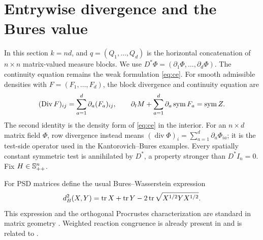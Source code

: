 \section{Entrywise divergence and the Bures value}\label{sec:bures}
In this section $k=nd$, and $q=(Q_1,\ldots,Q_d)$ is the horizontal
concatenation of $n\times n$ matrix-valued measure blocks. We use
$D^*\Phi=(\partial_1\Phi,\ldots,\partial_d\Phi)$.
The continuity equation remains the weak formulation \eqref{eq:ce}.
For smooth admissible densities with $F=(F_1,\ldots,F_d)$, the block
divergence and continuity equation are
\[
 (\operatorname{Div}F)_{ij}
   =\sum_{a=1}^d\partial_a(F_a)_{ij},\qquad
 \partial_tM+\sum_{a=1}^d\partial_a\operatorname{sym} F_a=\operatorname{sym} Z.
\]
The second identity is the density form of \eqref{eq:ce} in the interior.
For an $n\times d$ matrix field $\Phi$, row divergence instead means
$(\operatorname{div}\Phi)_i=\sum_{a=1}^d\partial_a\Phi_{ia}$;
it is the test-side operator used in the Kantorovich--Bures examples.
Every spatially constant symmetric test is annihilated by $D^*$, a property
stronger than $D^*I_n=0$. Fix $H\in\mathbb S_{++}^n$.

For PSD matrices define the usual Bures--Wasserstein expression
\[
 d_B^2(X,Y)=\operatorname{tr} X+\operatorname{tr} Y-2\operatorname{tr}\sqrt{X^{1/2}YX^{1/2}}.
\]
This expression and the orthogonal Procrustes characterization are standard
in matrix geometry \cite{BhatiaJainLim}. Weighted reaction congruence is already
present in \cite[Remark 3.11]{LiZou} and is related to \cite{HanEtAl}.

